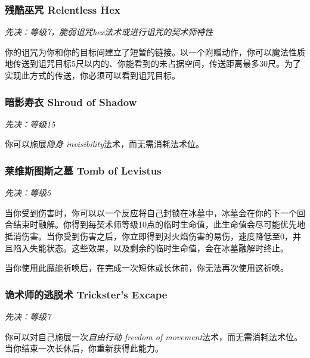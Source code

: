 \subsubsection{残酷巫咒 Relentless Hex}
\emph{先决：等级7，脆弱诅咒hex法术或进行诅咒的契术师特性}

你的诅咒为你和你的目标间建立了短暂的链接。以一个附赠动作，你可以魔法性质地传送到诅咒目标5尺以内的、你能看到的未占据空间，传送距离最多30尺。为了实现此方式的传送，你必须可以看到诅咒目标。

\subsubsection{暗影寿衣 Shroud of Shadow}
\emph{先决：等级15}

你可以施展\emph{隐身 invisibility}法术，而无需消耗法术位。

\subsubsection{莱维斯图斯之墓 Tomb of Levistus}
\emph{先决：等级5}

当你受到伤害时，你可以以一个反应将自己封锁在冰墓中，冰墓会在你的下一个回合结束时融解。你得到每契术师等级10点的临时生命值，此生命值会尽可能优先地抵消伤害。当你受到伤害之后，你立即得到对火焰伤害的易伤，速度降低至0，并且陷入失能状态。这些效果，以及剩余的临时生命值，会在冰墓融解时终止。

当你使用此魔能祈唤后，在完成一次短休或长休前，你无法再次使用这祈唤。

\subsubsection{诡术师的逃脱术 Trickster's Excape}
\emph{先决：等级7}

你可以对自己施展一次\emph{自由行动 freedom of movement}法术，而无需消耗法术位。当你结束一次长休后，你重新获得此能力。
